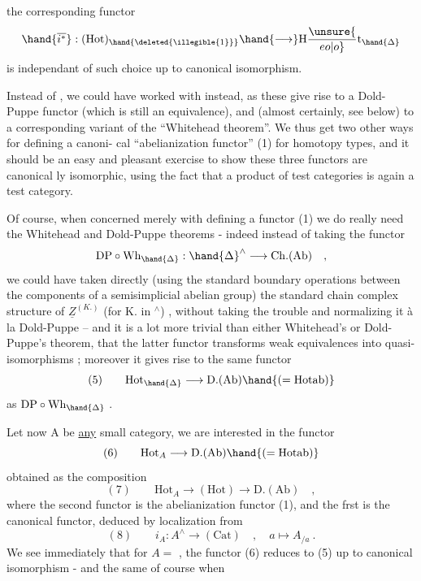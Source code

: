 
 the corresponding functor
\[ \hand{\overline{i^*}} : (\mathrm{Hot})_{\hand{\deleted{\illegible{1}}}} \hand{\longrightarrow} \mathrm{H}\unsure{\over{e}{o}|o}\mathrm{t}_{\hand{\Delta}} \]
is independant of such choice\inserted{,} up to canonical isomorphism.

Instead of \hand{$\Delta$} , we could have worked with \hand{$\Box$}  \hand{$\Diamond$} instead, as
these give rise to a Dold-Puppe functor (which is still an equivalence),
and (almost certainly, see below) to a corresponding variant of the
``Whitehead theorem''. We thus get two other ways for defining a canoni-%
cal ``abelianization functor'' (1) for homotopy types, and it should be
an easy and pleasant exercise to show these three functors are canonical%
ly  isomorphic, using the fact that a product of test categories
is again a test category.

 Of course, when concerned merely with defining a functor (1)\unsure{;}
we do really need the Whitehead and Dold-Puppe theorems - indeed
instead of taking the functor
\[ \mathrm{DP} \circ \mathrm{Wh}_{\hand{\Delta}} : \hand{\Delta}^{\wedge} \longrightarrow \mathrm{Ch.(Ab)} \quad , \]
we could have taken directly (using the standard boundary operations
between the components of a semisimplicial abelian group) the standard
 chain complex structure of $\underline{Z}^{(K.)}$ (for K. in \hand{$\Delta$}$^{\wedge}$) , without
taking the trouble and normalizing it à la Dold-Puppe -- and it is
a lot more trivial than either Whitehead's or Dold-Puppe's theorem,
that the latter functor transforms  weak equivalences into
quasi-isomorphisms ;  moreover it gives rise to the same functor
\[ (5) \qquad \mathrm{Hot}_{\hand{\Delta}} \longrightarrow \mathrm{D.(Ab)}\hand{(=\mathrm{Hotab})} \]
as $\mathrm{DP}\circ\mathrm{Wh}_{\hand{\Delta}}$ .

Let now A be \uline{any} small category, we are interested in the
functor
\[ (6) \qquad \mathrm{Hot}_{A} \longrightarrow \mathrm{D.(Ab)}\hand{(=\mathrm{Hotab})} \]
obtained as the composition
\[ (7) \qquad \mathrm{Hot}_{A} \longrightarrow (\mathrm{Hot}) \longrightarrow \mathrm{D.(Ab)} \quad , \]
where the second functor is the abelianization functor (1), and the
frst is the canonical functor, deduced by localization from
\[ (8) \qquad i_{A} : A^{\wedge} \longrightarrow (\mathrm{Cat}) \quad , \quad a \longmapsto A_{/a} \ . \]
We see immediately that for $A = $ \hand{$\Delta$} , the functor (6) reduces to
(5) up to canonical isomorphism - and the same of course  when

